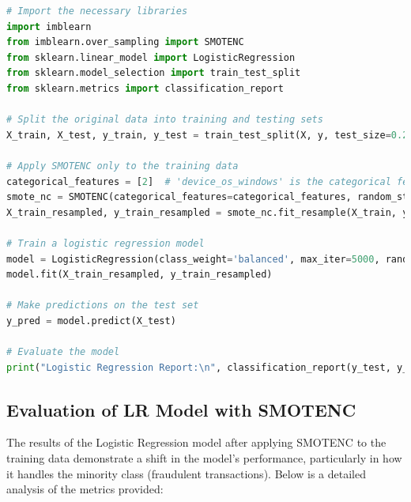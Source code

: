 \documentclass[12pt,a4paper]{report}
\begin{document}
\begin{lstlisting}[language=Python, caption={Applying SMOTENC and Training Logistic Regression}]
# Import the necessary libraries
import imblearn
from imblearn.over_sampling import SMOTENC
from sklearn.linear_model import LogisticRegression
from sklearn.model_selection import train_test_split
from sklearn.metrics import classification_report

# Split the original data into training and testing sets
X_train, X_test, y_train, y_test = train_test_split(X, y, test_size=0.2, random_state=59)

# Apply SMOTENC only to the training data
categorical_features = [2]  # 'device_os_windows' is the categorical feature at index 2
smote_nc = SMOTENC(categorical_features=categorical_features, random_state=59)
X_train_resampled, y_train_resampled = smote_nc.fit_resample(X_train, y_train)

# Train a logistic regression model
model = LogisticRegression(class_weight='balanced', max_iter=5000, random_state=59)
model.fit(X_train_resampled, y_train_resampled)

# Make predictions on the test set
y_pred = model.predict(X_test)

# Evaluate the model
print("Logistic Regression Report:\n", classification_report(y_test, y_pred, zero_division=0))
\end{lstlisting}

\subsection{Evaluation of LR Model with SMOTENC}

The results of the Logistic Regression model after applying SMOTENC to the training data demonstrate a shift in the model’s performance, particularly in how it handles the minority class (fraudulent transactions). Below is a detailed analysis of the metrics provided:
\end{document}
